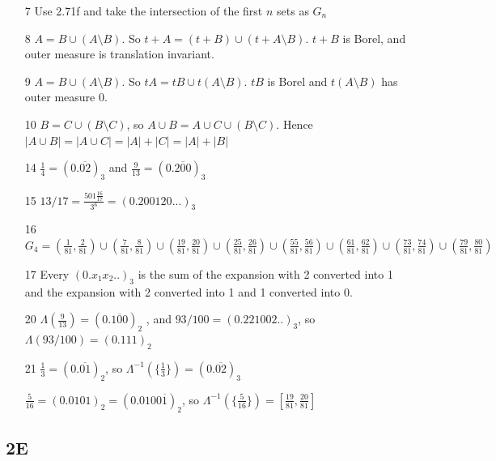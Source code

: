 \documentclass{article}
\begin{document}
\begin{itemize}
    
    \item [7] Use 2.71f and take the intersection of the first $n$ sets as $G_n$

    \item [8] $A=B \cup (A \setminus B)$. So $t+A=(t+B) \cup(t + A \setminus B)$. $t + B$ is Borel, and outer measure is translation invariant.

    \item[9] $A=B \cup (A \setminus B)$. So $tA=tB \cup t(A \setminus B)$. $tB$ is Borel and $t(A \setminus B)$ has outer measure 0.

    \item[10] $B = C \cup (B \setminus C) $, so $A \cup B=A \cup C \cup (B \setminus C) $. Hence $|A \cup B|=|A \cup C|=|A|+|C|=|A|+|B|$ 

    \item [14] $\frac{1}{4}=(0.\overline{02})_3$ and $\frac{9}{13}=(0.\overline{200})_3$

    \item [15] $13/17=\frac{501\frac{16}{17}}{3^6}=(0.200120...)_3$

    \item [16] $G_4=(\frac{1}{81},\frac{2}{81})\cup(\frac{7}{81},\frac{8}{81})\cup(\frac{19}{81},\frac{20}{81})\cup(\frac{25}{81},\frac{26}{81})\cup(\frac{55}{81},\frac{56}{81})\cup(\frac{61}{81},\frac{62}{81})\cup(\frac{73}{81},\frac{74}{81})\cup(\frac{79}{81},\frac{80}{81})$

    \item [17] Every $(0.x_1x_2..)_3$ is the sum of the expansion with 2 converted into 1 and the expansion with 2 converted into 1 and 1 converted into 0.

    \item [20] $\Lambda(\frac{9}{13})=(0.\overline{100})_2$ , and $93/100=(0.221002..)_3$, so $\Lambda(93/100)=(0.111)_2$

    \item[21] $\frac{1}{3}=(0.\overline{01})_2$, so $\Lambda^{-1}(\{\frac{1}{3}\})=(0.\overline{02})_3$

    $\frac{5}{16}=(0.0101)_2=(0.0100\overline{1})_2$, so $\Lambda^{-1}(\{\frac{5}{16}\})=[\frac{19}{81},\frac{20}{81}]$

\end{itemize}

\subsection*{2E}
\end{document}
